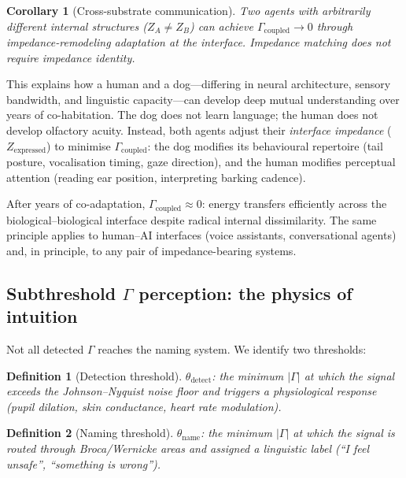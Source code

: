 \documentclass[aps,pre,twocolumn,superscriptaddress,floatfix]{revtex4-2}
\newtheorem{corollary}{Corollary}
\newtheorem{definition}{Definition}
\begin{document}
\begin{corollary}[Cross-substrate communication]
\label{cor:cross-substrate}
Two agents with arbitrarily different internal structures
($Z_A \neq Z_B$) can achieve $\Gamma_{\text{coupled}}\to 0$
through impedance-remodeling adaptation at the interface.
Impedance \emph{matching} does not require impedance
\emph{identity}.
\end{corollary}

This explains how a human and a dog---differing in neural
architecture, sensory bandwidth, and linguistic
capacity---can develop deep mutual understanding over years
of co-habitation.  The dog does not learn language; the human
does not develop olfactory acuity.  Instead, both
agents adjust their \emph{interface impedance}
($Z_{\text{expressed}}$) to minimise $\Gamma_{\text{coupled}}$:
the dog modifies its behavioural repertoire
(tail posture, vocalisation timing, gaze direction), and
the human modifies perceptual attention (reading ear position,
interpreting barking cadence).

After years of co-adaptation, $\Gamma_{\text{coupled}}\approx 0$:
energy transfers efficiently across the biological--biological
interface despite radical internal dissimilarity.
The same principle applies to human--AI interfaces (voice
assistants, conversational agents) and, in principle, to
any pair of impedance-bearing systems.


\subsection{Subthreshold $\Gamma$ perception: the physics
  of intuition}
\label{sec:intuition}

Not all detected $\Gamma$ reaches the naming system.
We identify two thresholds:

\begin{definition}[Detection threshold]
$\theta_{\text{detect}}$: the minimum $|\Gamma|$ at which
the signal exceeds the Johnson--Nyquist noise floor and
triggers a physiological response (pupil dilation,
skin conductance, heart rate modulation).
\end{definition}

\begin{definition}[Naming threshold]
$\theta_{\text{name}}$: the minimum $|\Gamma|$ at which
the signal is routed through Broca/Wernicke areas and
assigned a linguistic label (``I feel unsafe'',
``something is wrong'').
\end{definition}
\end{document}
